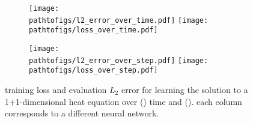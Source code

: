 \begin{figure}[!h]
  \centering
  \def\pathtofigs{../kfac_pinns_exp/exp24_heat1d_groupplot}
  \begin{subfigure}[t]{1.0\linewidth}
    \caption{}\label{subfig:heat1d-time}
    \texttt{[image: \\pathtofigs/l2\_error\_over\_time.pdf]}
    \texttt{[image: \\pathtofigs/loss\_over\_time.pdf]}
  \end{subfigure}
  \begin{subfigure}[t]{1.0\linewidth}
    \caption{}\label{subfig:heat1d-step}
    \texttt{[image: \\pathtofigs/l2\_error\_over\_step.pdf]}
    \texttt{[image: \\pathtofigs/loss\_over\_step.pdf]}
  \end{subfigure}
  \caption{training loss and evaluation $L_2$ error for learning the solution to a 1+1-dimensional heat equation over () time and (). each column corresponds to a different neural network.}\label{fig:heat1d-appendix}
\end{figure}

